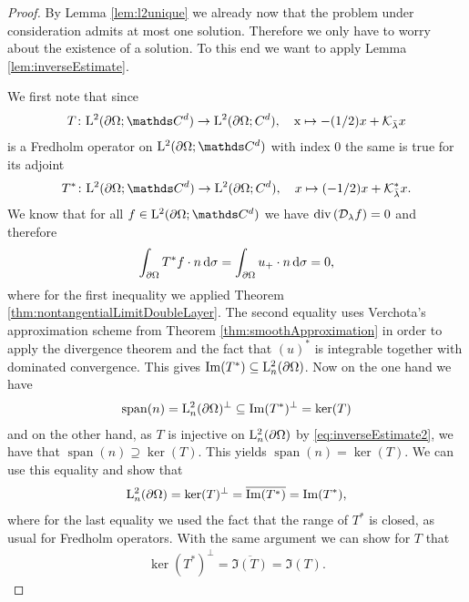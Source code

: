 \begin{proof}
  By Lemma \ref{lem:l2unique} we already now that the problem under consideration admits at most one solution.
  Therefore we only have to worry about the existence of a solution.
  To this end we want to apply Lemma \ref{lem:inverseEstimate}.
  
  We first note that since 
  \begin{align*}
    T \colon \Ell^2(\partial\Omega; \C^d) \to \Ell^2(\partial\Omega; C^d), \quad\text x \mapsto -(1/2)x  + \K_{\bar \lambda}x
  \end{align*}
  is a Fredholm operator on $\Ell^2(\partial\Omega; \C^d)$ with index $0$ the same is true for its adjoint 
  \begin{align*}
    T^* \colon \Ell^2(\partial\Omega; \C^d) \to \Ell^2(\partial\Omega; C^d),\quad x \mapsto  (-1/2)x + \K_{\bar\lambda}^*x.
  \end{align*}
  We know that for all $f \in \Ell^2(\partial\Omega; \C^d)$ we have $\mathrm{div\,} (\mathcal{D}_\lambda f) = 0$ and therefore
  \begin{align*}
    \int_{\partial\Omega} T^* f \cdot n \, {\operatorname{d}\!{\sigma}} =\int_{\partial\Omega} u_+ \cdot n \, {\operatorname{d}\!{\sigma}} =  0, 
  \end{align*}
  where for the first inequality we applied Theorem \ref{thm:nontangentialLimitDoubleLayer}. The second equality uses Verchota's approximation scheme from Theorem \ref{thm:smoothApproximation} in order to apply the divergence theorem and the fact that $(u)^*$ is integrable together with dominated convergence.
  This gives $\operatorname{Im}(T^*) \subseteq \mathrm{L}_n^2(\partial\Omega)$.
  Now on the one hand we have
  \begin{align*}
    \operatorname{span}(n)
    = \mathrm{L}_n^2(\partial\Omega)^\perp
    \subseteq \operatorname{Im}(T^*)^\perp
    = \ker(T)
  \end{align*}
  and on the other hand, as $T$ is injective on $\mathrm{L}^2_n(\partial\Omega)$ by \eqref{eq:inverseEstimate2}, we have that $ \operatorname{span}(n) \supseteq \ker(T)$.
  This yields $\operatorname{span}(n) = \ker(T)$.
  We can use this equality and show that
  \begin{align*}
    \mathrm{L}^2_n(\partial\Omega) = \ker(T)^\perp = \overline{\operatorname{Im}(T^*)} = \operatorname{Im}(T^*),
  \end{align*}
  where for the last equality we used the fact that the range of $T^*$ is closed, as usual for Fredholm operators.
  With the same argument we can show for $T$ that
  \begin{align*}
    \ker(T^*)^\perp = \overline{\Im(T)} = \Im(T).

\end{align*}
\end{proof}
